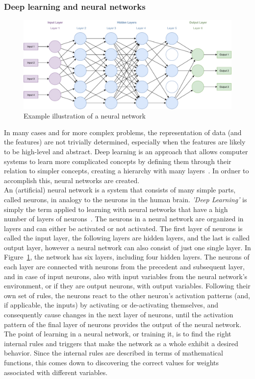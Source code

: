 \documentclass[
a4paper,
pagesize,
pdftex,
12pt,
twoside, %
BCOR=5mm, %
ngerman,
fleqn,
final,
]{scrartcl}
\begin{document}
	\subsubsection{Deep learning and neural networks}\label{Deep-Learning}
	\begin{figure}[ht]
		\centering
		\includegraphics[width=\linewidth]{img/NeuralNetwork}
		\caption{Example illustration of a neural network}
		\label{fig:neuralnetwork}
	\end{figure}
	In many cases and for more complex problems, the representation of data (and the features) are not trivially determined, especially when the features are likely to be high-level and abstract. Deep learning is an approach that allows computer systems to learn more complicated concepts by defining them through their relation to simpler concepts, creating a hierarchy with many layers~\cite{Goodfellow.2016}.	In ordner to accomplish this, neural networks are created.\\
	An (artificial) neural network is a system that consists of many simple parts, called neurons, in analogy to the neurons in the human brain. \textit{'Deep Learning'} is simply the term applied to learning with neural networks that have a high number of layers of neurons~\cite{Nielsen.2015}. The neurons in a neural network are organized in layers and can either be activated or not activated. The first layer of neurons is called the input layer, the following layers are hidden layers, and the last is called output layer, however a neural network can also consist of just one single layer. In Figure~\ref{fig:neuralnetwork}, the network has six layers, including four hidden layers. The neurons of each layer are connected with neurons from the precedent and subsequent layer, and in case of input neurons, also with input variables from the neural network's environment, or if they are output neurons, with output variables. Following their own set of rules, the neurons react to the other neuron's activation patterns (and, if applicable, the inputs) by activating or de-activating themselves, and consequently cause changes in the next layer of neurons, until the activation pattern of the final layer of neurons provides the output of the neural network. The point of learning in a neural network, or training it, is to find the right internal rules and triggers that make the network as a whole exhibit a desired behavior. Since the internal rules are described in terms of mathematical functions, this comes down to discovering the correct values for weights associated with different variables.\\
\end{document}
